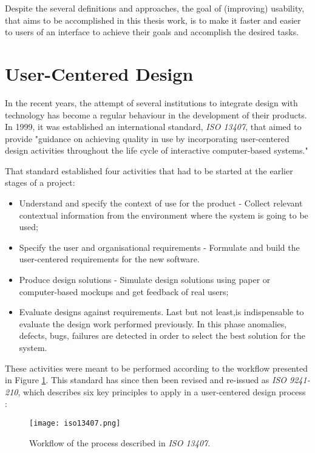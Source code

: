 Despite the several definitions and approaches, the goal of  (improving) usability, that aims to be accomplished in this thesis work, is to make it faster and easier to users of an interface to achieve their goals and accomplish the desired tasks.


\section{User-Centered Design}

In the recent years, the attempt of several institutions to integrate design with technology has become a regular behaviour in the development of their products.
In 1999, it was established an international standard, \emph{ISO 13407}, that aimed to provide "guidance on achieving quality in use by incorporating user-centered design activities throughout the life cycle of interactive computer-based systems."

That standard established four activities that had to be started at the earlier stages of a project:

\begin{itemize}
\item Understand and specify the context of use for the product - Collect relevant contextual information from the environment where the system is going to be used;
\item Specify the user and organisational requirements - Formulate and build the user-centered
requirements for the new software.
\item Produce design solutions - Simulate design solutions using paper or computer-based mockups and get feedback of real users;
\item Evaluate designs against requirements. Last but not least,is indispensable to evaluate
the design work performed previously. In this phase anomalies, defects, bugs, failures are detected in order to select the best solution for the system.
\end{itemize}

These activities were meant to be performed according to the workflow presented in Figure \ref{fig:iso}. This standard has since then been revised and re-issued as \emph{ISO 9241-210}, which describes six key principles to apply in a user-centered design process \cite{kn:Tra11}:

\begin{figure}[h!]
  \begin{center}
    \leavevmode
    \texttt{[image: iso13407.png]}
    \caption{Workflow of the process described in \emph{ISO 13407}.}
    \label{fig:iso}
  \end{center}
\end{figure}

